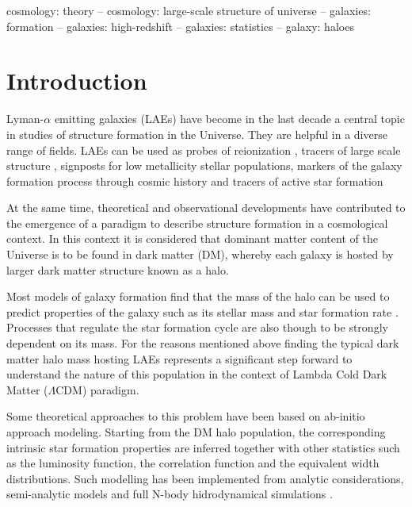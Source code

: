 \documentclass[usenatbib]{mn2e}
\begin{document}
\begin{keywords}
{cosmology: theory – cosmology: large-scale structure of universe –
  galaxies: formation – galaxies: high-redshift – galaxies: statistics
  – galaxy: haloes} 
\end{keywords}


\section{Introduction}

Lyman-$\alpha$ emitting galaxies (LAEs) have become in the last decade
a  central topic in studies of structure formation in the Universe. They 
are helpful in a diverse range of fields. LAEs can be used as probes
of reionization \citep{Dijkstra11}, tracers of large scale structure
\citep{Koehler2007},  signposts for low metallicity stellar
populations, markers of the galaxy formation process through
cosmic history \citep{ForeroRomero2012} and tracers of active star
formation  \citep{Guaita2013}

At the same time, theoretical and observational developments have
contributed to the emergence of a paradigm to describe structure
formation in a cosmological context. In this context it is considered
that dominant matter content of the Universe is to be found in dark
matter (DM), whereby each galaxy is hosted by larger dark matter structure
known as a halo. \citep{Peebles1980}

Most models of galaxy formation find that the mass of the halo can be
used to predict properties of the galaxy such as its stellar mass and
star formation rate \citep{Behroozi2012}. Processes that regulate the
star formation cycle are also though to be strongly dependent on its
mass.  For the reasons mentioned above finding the typical dark matter
halo mass hosting LAEs represents a significant step forward to
understand the nature of this population in the context of Lambda Cold
Dark Matter ($\Lambda$CDM) paradigm.   

Some theoretical approaches to this problem have been based on
ab-initio approach modeling. Starting from the DM halo population, the
corresponding intrinsic star formation properties are inferred
together with other statistics such as the luminosity function, the
correlation function and the equivalent width distributions. Such
modelling has been implemented from analytic considerations,
semi-analytic models  and  full N-body hidrodynamical simulations
\citep{Laursen2007, Dayal2009, ForeroRomero2011, Yajima2012, Orsi2012, Soler2012}. 
\end{document}
